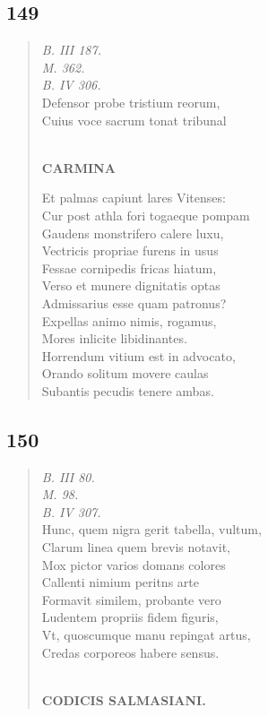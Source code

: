 \documentclass[11pt, a4paper]{report}
\begin{document}
            \subsection*{149}
      \begin{verse}
      \textit{B. III 187.} \\ \textit{M. 362.} \\ \textit{B. IV 306.} \\ Defensor probe tristium reorum, \\ Cuius voce sacrum tonat tribunal \\ 
        ﻿\pagebreak 
    \begin{center} \textbf{CARMINA} \end{center} \marginpar{[144]} Et palmas capiunt lares Vitenses: \\ Cur post athla fori togaeque pompam \\ Gaudens monstrifero calere luxu, \\ Vectricis propriae furens in usus \\ Fessae cornipedis fricas hiatum, \\ Verso et munere dignitatis optas \\ Admissarius esse quam patronus? \\ Expellas animo nimis, rogamus, \\ Mores inlicite libidinantes. \\ Horrendum vitium est in advocato, \\ Orando solitum movere caulas \\ Subantis pecudis tenere ambas. \\ 
      \end{verse}
  
            \subsection*{150}
      \begin{verse}
      \textit{B. III 80.} \\ \textit{M. 98.} \\ \textit{B. IV 307.} \\ Hunc, quem nigra gerit tabella, vultum, \\ Clarum linea quem brevis notavit, \\ Mox pictor varios domans colores \\ Callenti nimium peritns arte \\ Formavit similem, probante vero \\ Ludentem propriis fidem figuris, \\ Vt, quoscumque manu repingat artus, \\ Credas corporeos habere sensus. \\ 
        ﻿\pagebreak 
    \begin{center} \textbf{CODICIS SALMASIANI.} \end{center} \marginpar{[145]} 
      \end{verse}
  
\end{document}
